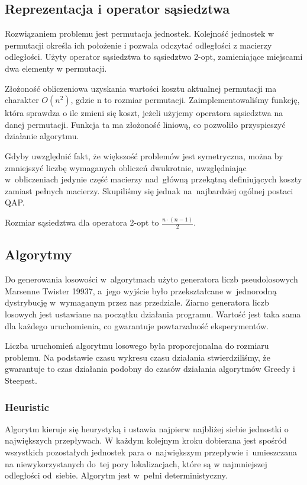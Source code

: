 \documentclass[a4paper,10pt]{article}
\begin{document}
\subsection{Reprezentacja i operator sąsiedztwa}
Rozwiązaniem problemu jest permutacja jednostek.
Kolejność jednostek w permutacji określa ich położenie i pozwala odczytać odległości z macierzy odległości.
Użyty operator sąsiedztwa to sąsiedztwo 2-opt, zamieniające miejscami dwa elementy w permutacji.

Złożoność obliczeniowa uzyskania wartości kosztu aktualnej permutacji ma charakter $O(n^2)$, gdzie n to rozmiar permutacji.
Zaimplementowaliśmy funkcję, która sprawdza o ile zmieni się koszt, jeżeli użyjemy operatora sąsiedztwa na danej permutacji.
Funkcja ta ma złożoność liniową, co pozwoliło przyspieszyć działanie algorytmu.

Gdyby uwzględnić fakt, że większość problemów jest symetryczna, można by zmniejszyć liczbę wymaganych obliczeń dwukrotnie,
uwzględniając w~obliczeniach jedynie część macierzy nad~główną przekątną definiujących koszty zamiast pełnych macierzy.
Skupiliśmy się jednak na~najbardziej ogólnej postaci QAP.

Rozmiar sąsiedztwa dla operatora 2-opt to $\frac{n \cdot (n-1)}{2}$.

\subsection{Algorytmy}
Do generowania losowości w~algorytmach użyto generatora liczb pseudolosowych Marsenne Twister 19937,
a~jego wyjście było przekształcane w~jednorodną dystrybucję w~wymaganym przez nas przedziale.
Ziarno generatora liczb losowych jest ustawiane na początku działania programu.
Wartość jest taka sama dla każdego uruchomienia, co gwarantuje powtarzalność eksperymentów.

Liczba uruchomień algorytmu losowego była proporcjonalna do rozmiaru problemu.
Na podstawie czasu wykresu czasu działania stwierdziliśmy, że gwarantuje to czas działania podobny do czasów działania algorytmów Greedy i Steepest.

\subsubsection{Heuristic}
Algorytm kieruje się heurystyką i ustawia najpierw najbliżej siebie jednostki o największych przepływach.
W każdym kolejnym kroku dobierana jest spośród wszystkich pozostałych jednostek para o~największym przepływie
i~umieszczana na niewykorzystanych do~tej pory lokalizacjach, które są w najmniejszej odległości od~siebie.
Algorytm jest w~pełni deterministyczny.
\end{document}
